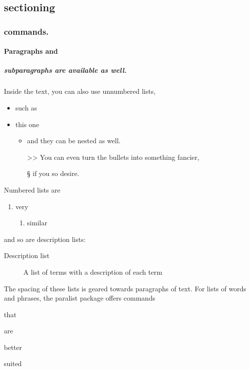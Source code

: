 \documentclass[
  digital, %
  table,   %
  lof,     %
  lot,     %
]{fithesis3}
\begin{document}
\subsection{sectioning}
\subsubsection{commands.}
\paragraph{Paragraphs and}
\subparagraph{subparagraphs are available as well.}
Inside the text, you can also use unnumbered lists,
\begin{itemize}
  \item such as
  \item this one
  \begin{itemize}
    \item     and they can be nested as well.
    \item[>>] You can even turn the bullets into something fancier,
    \item[\S] if you so desire.
  \end{itemize}
\end{itemize}
Numbered lists are
\begin{enumerate}
  \item very
  \begin{enumerate}
    \item similar
  \end{enumerate}
\end{enumerate}
and so are description lists:
\begin{description}
  \item[Description list]
    A list of terms with a description of each term
\end{description}
The spacing of these lists is geared towards paragraphs of text.
For lists of words and phrases, the \textsf{paralist} package
offers commands
\begin{compactitem}
  \item that
  \begin{compactitem}
    \item are
    \begin{compactitem}
      \item better
      \begin{compactitem}
        \item suited
      \end{compactitem}
    \end{compactitem}
  \end{compactitem}
\end{compactitem}
\end{document}
